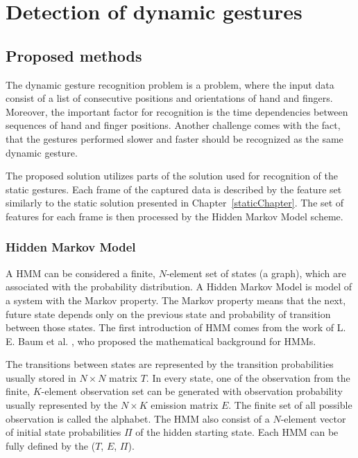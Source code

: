 \chapter{Detection of dynamic gestures}

\section{Proposed methods}

The dynamic gesture recognition problem is a problem, where the input data consist of a list of consecutive positions and orientations of hand and fingers. 
Moreover, the important factor for recognition is the time dependencies between sequences of hand and finger positions.
Another challenge comes with the fact, that the gestures performed slower and faster should be recognized as the same dynamic gesture.

The proposed solution utilizes parts of the solution used for recognition of the static gestures.
Each frame of the captured data is described by the feature set similarly to the static solution presented in Chapter~\ref{staticChapter}.
The set of features for each frame is then processed by the Hidden Markov Model scheme. 

\subsection{Hidden Markov Model}

A HMM can be considered a finite, $N$-element set of states (a graph), which are associated with the probability distribution.
A Hidden Markov Model is model of a system with the Markov property.
The Markov property means that the next, future state depends only on the previous state and probability of transition between those states.
The first introduction of HMM comes from the work of L. E. Baum et al. \cite{hmmfirst}, who proposed the mathematical background for HMMs.

The transitions between states are represented by the transition probabilities usually stored in $N \times N$ matrix $T$.
In every state, one of the observation from the finite, $K$-element observation set can be generated with observation probability usually represented by the $N \times K$ emission matrix $E$.
The finite set of all possible observation is called the alphabet.
The HMM also consist of a $N$-element vector of initial state probabilities $\Pi$ of the hidden starting state.
Each HMM can be fully defined by the ($T$, $E$, $\Pi$).

